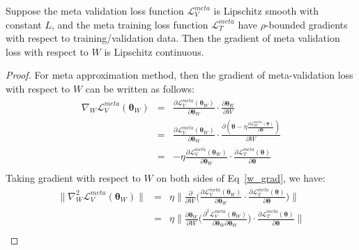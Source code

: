 \begin{lemma} \label{meta-weight-lipschitz}
Suppose the meta validation loss function $\mathcal{L}_V^{meta}$ is Lipschitz smooth with constant $L$, and the meta training loss function $\mathcal{L}_T^{meta}$ have $\rho$-bounded gradients with respect to training/validation data. Then the gradient of meta validation loss with respect to $W$ is Lipschitz continuous.
\end{lemma}

\begin{proof}
For meta approximation method, then the gradient of meta-validation loss with respect to $W$ can be written as follows:
\begin{eqnarray}
    \nabla_W \mathcal{L}_V^{meta}(\boldsymbol{\theta}_W) &=& \frac{\partial \mathcal{L}_V^{meta}(\boldsymbol{\theta}_{W})}{\partial \boldsymbol{\theta}_{W}} \cdot \frac{\partial \boldsymbol{\theta}_{W}}{\partial W} \nonumber \\
    &=& \frac{\partial \mathcal{L}_V^{meta}(\boldsymbol{\theta}_W)}{\partial \boldsymbol{\theta}_W} \cdot  \frac{\partial\left(\boldsymbol{\theta} - \eta \frac{\partial \mathcal{L}_{W}^{meta}(\boldsymbol{\theta})}{\partial \boldsymbol{\theta}}\right)}{\partial W} \nonumber \\
    &=& - \eta \frac{\partial \mathcal{L}_V^{meta}(\boldsymbol{\theta}_W)}{\partial \boldsymbol{\theta}_W} \cdot  \frac{\partial \mathcal{L}_{T}^{meta}(\boldsymbol{\theta})}{\partial \boldsymbol{\theta}} \nonumber \\
    \label{w_grad}
\end{eqnarray}
Taking gradient with respect to $W$ on both sides of Eq~\eqref{w_grad}, we have:
\begin{eqnarray}
     \|\nabla^2_W \mathcal{L}_V^{meta}(\boldsymbol{\theta}_W) \|
     &=& \eta \Big\|\frac{\partial}{\partial W} \Big( \frac{\partial \mathcal{L}_V^{meta}(\boldsymbol{\theta}_W)}{\partial \boldsymbol{\theta}_W} \cdot \frac{\partial\mathcal{L}_T^{meta}(\boldsymbol{\theta})}{\partial \boldsymbol{\theta}} \Big)\Big\| \nonumber \\
     &=& \eta \Big\|\frac{\partial\boldsymbol{\theta}_W}{\partial W} \Big( \frac{\partial^2 \mathcal{L}_V^{meta}(\boldsymbol{\theta}_W)}{\partial \boldsymbol{\theta}_W\partial \boldsymbol{\theta}_W}\Big) \cdot \frac{\partial\mathcal{L}_T^{meta}(\boldsymbol{\theta})}{\partial \boldsymbol{\theta}}\Big\|  \nonumber \\

\end{eqnarray}
\end{proof}
